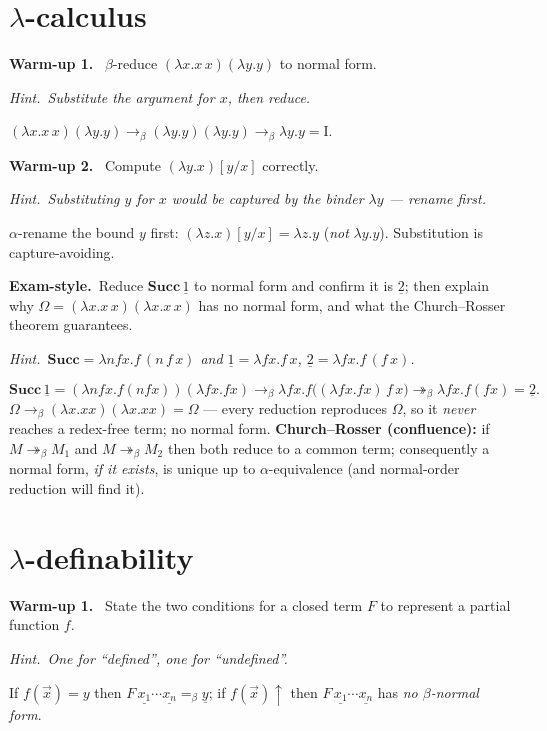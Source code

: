 \documentclass[11pt,a4paper]{article}
\newcommand{\hint}[1]{\par{\small\textcolor{accent}{\textit{Hint.}}\ \textit{#1}}\par\smallskip}
\newcommand{\warm}[1]{\smallskip\textbf{\textcolor{hi}{Warm-up #1.}}\ }
\newcommand{\exam}{\smallskip\textbf{\textcolor{warn}{Exam-style.}}\ }
\newcommand{\cn}[1]{\underline{#1}}
\newcommand{\lam}{\lambda}
\newcommand{\bred}{\to_\beta}
\newcommand{\breds}{\twoheadrightarrow_\beta}
\newcommand{\beq}{=_\beta}
\begin{document}
\section{$\lambda$-calculus}

\warm{1} $\beta$-reduce $(\lam x.x\,x)(\lam y.y)$ to normal form.
\hint{Substitute the argument for $x$, then reduce.}
\begin{sol}$(\lam x.x\,x)(\lam y.y)\bred (\lam y.y)(\lam y.y)\bred \lam y.y=\mathrm I$.\end{sol}

\warm{2} Compute $(\lam y.x)[y/x]$ correctly.
\hint{Substituting $y$ for $x$ would be \emph{captured} by the binder $\lam y$ --- rename first.}
\begin{sol}$\alpha$-rename the bound $y$ first: $(\lam z.x)[y/x]=\lam z.y$ \;(\emph{not} $\lam y.y$). Substitution is capture-avoiding.\end{sol}

\exam Reduce $\mathbf{Succ}\,\cn1$ to normal form and confirm it is $\cn2$; then explain why $\Omega=(\lam x.x\,x)(\lam x.x\,x)$ has no normal form, and what the Church--Rosser theorem guarantees.
\hint{$\mathbf{Succ}=\lam n f x.f\,(n\,f\,x)$ and $\cn1=\lam f x.f\,x$, $\cn2=\lam f x.f\,(f\,x)$.}
\begin{sol}
\[
\mathbf{Succ}\,\cn1=(\lam n f x.f(nfx))(\lam fx.fx)\bred \lam fx.f\big((\lam fx.fx)\,f\,x\big)\breds \lam fx.f(fx)=\cn2.
\]
$\Omega\bred(\lam x.xx)(\lam x.xx)=\Omega$ --- every reduction reproduces $\Omega$, so it \emph{never} reaches a redex-free term; no normal form. \textbf{Church--Rosser (confluence):} if $M\breds M_1$ and $M\breds M_2$ then both reduce to a common term; consequently a normal form, \emph{if it exists}, is unique up to $\alpha$-equivalence (and normal-order reduction will find it).
\end{sol}

\section{$\lambda$-definability}

\warm{1} State the two conditions for a closed term $F$ to represent a partial function $f$.
\hint{One for ``defined'', one for ``undefined''.}
\begin{sol}If $f(\vec x){=}y$ then $F\,\cn{x_1}\cdots\cn{x_n}\beq\cn y$; if $f(\vec x){\uparrow}$ then $F\,\cn{x_1}\cdots\cn{x_n}$ has \emph{no $\beta$-normal form}.\end{sol}
\end{document}
